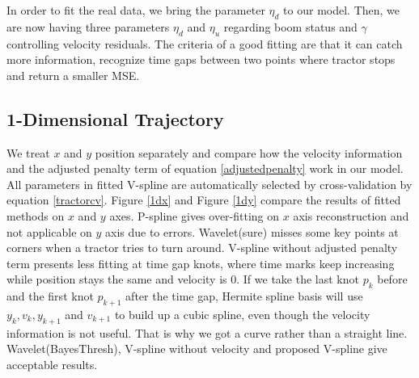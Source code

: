 In order to fit the real data, we bring the parameter $\eta_d$ to our model. Then, we are now having three parameters $\eta_d$ and $\eta_u$ regarding boom status and $\gamma$ controlling velocity residuals. The criteria of a good fitting are that it can catch more information, recognize time gaps between two points where tractor stops and return a smaller MSE. 



\subsection{1-Dimensional Trajectory}

We treat $x$ and $y$ position separately and compare how the velocity information and the adjusted penalty term of equation \eqref{adjustedpenalty} work in our model. All parameters in fitted V-spline are automatically selected by cross-validation by equation \eqref{tractorcv}. Figure \ref{1dx} and Figure \ref{1dy} compare the results of fitted methods on $x$ and $y$ axes. P-spline gives over-fitting on $x$ axis reconstruction and not applicable on $y$ axis due to errors. Wavelet(sure) misses some key points at corners when a tractor tries to turn around. V-spline without adjusted penalty term presents less fitting at time gap knots, where time marks keep increasing while position stays the same and velocity is 0. If we take the last knot $p_k$ before and the first knot $p_{k+1}$ after the time gap, Hermite spline basis will use $y_k, v_k, y_{k+1}$ and $v_{k+1}$ to build up a cubic spline, even though the velocity information is not useful. That is why we got a curve rather than a straight line. Wavelet(BayesThresh), V-spline without velocity and proposed V-spline give acceptable results.


